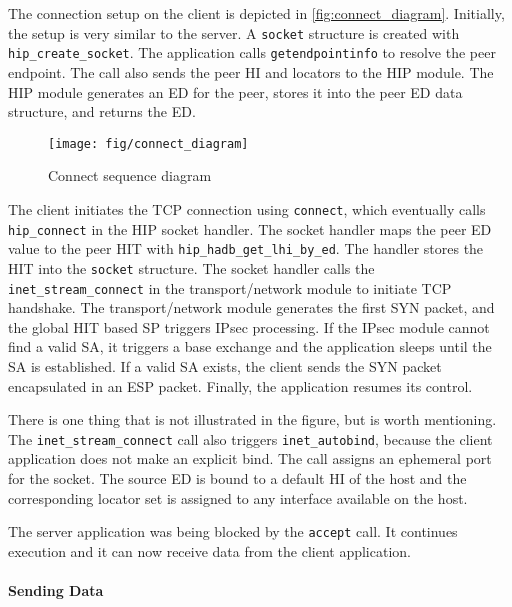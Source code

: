 The connection setup on the client is depicted in
\autoref{fig:connect_diagram}. Initially, the setup is very similar to
the server. A \verb|socket| structure is created with
\verb|hip_create_socket|. The application calls \verb|getendpointinfo|
to resolve the peer {endpoint}. The call also sends the peer HI
and locators to the HIP module. The HIP module generates an ED for the
peer, stores it into the peer ED data structure, and returns the ED.

\begin{figure}[htb]
\begin{center}
\texttt{[image: fig/connect\_diagram]}
\end{center}
\caption{Connect sequence diagram}
\label{fig:connect_diagram}
\end{figure}

The client initiates the TCP connection using \verb|connect|, which
eventually calls \\ {\verb|hip_connect|} in the HIP socket handler. The
socket handler maps the peer ED value to the peer HIT with
\verb|hip_hadb_get_lhi_by_ed|. The handler stores the HIT into the
\verb|socket| structure. The socket handler calls the
\verb|inet_stream_connect| in the transport/network module to initiate
TCP handshake. The transport/network module generates the first SYN
packet, and the global HIT based SP triggers IPsec processing. If the
IPsec module cannot find a valid SA, it triggers a base exchange and
the application sleeps until the SA is established. If a valid SA
exists, the client sends the SYN packet encapsulated in an ESP
packet. Finally, the application resumes its control.

There is one thing that is not illustrated in the figure, but is worth
mentioning. The \verb|inet_stream_connect| call also triggers
\verb|inet_autobind|, because the client application does not make an
explicit bind. The call assigns an ephemeral port for the socket.  The
source ED is bound to a default HI of the host and the corresponding
locator set is assigned to any interface available on the host.

The server application was being blocked by the \verb|accept| call. It
continues execution and it can now receive data from the client
application.

\paragraph{Sending Data}

